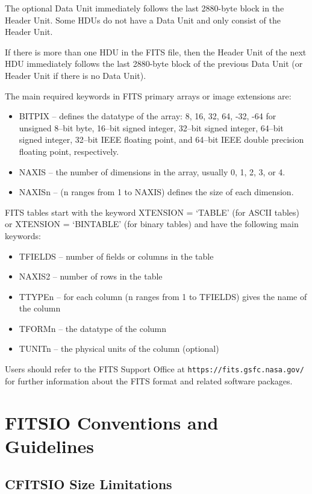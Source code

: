 \documentclass[11pt]{book}
\begin{document}
The optional Data Unit immediately follows the last 2880-byte block in
the Header Unit.  Some HDUs do not have a Data Unit and only consist of
the Header Unit.

If there is more than one HDU in the FITS file, then the Header Unit of
the next HDU immediately follows the last 2880-byte block of the
previous Data Unit (or Header Unit if there is no Data Unit).

The main required keywords in FITS primary arrays or image extensions are:
\begin{itemize}
\item
BITPIX -- defines the datatype of the array: 8, 16, 32, 64, -32, -64 for
unsigned 8--bit byte, 16--bit signed integer, 32--bit signed integer,
64--bit signed integer,
32--bit IEEE floating point, and 64--bit IEEE double precision floating
point, respectively.
\item
NAXIS --  the number of dimensions in the array, usually 0, 1, 2, 3, or 4.
\item
NAXISn -- (n ranges from 1 to NAXIS) defines the size of each dimension.
\end{itemize}

FITS tables start with the keyword XTENSION = `TABLE' (for ASCII
tables) or XTENSION = `BINTABLE' (for binary tables) and have the
following main keywords:
\begin{itemize}
\item
TFIELDS -- number of fields or columns in the table
\item
NAXIS2 -- number of rows in the table
\item
TTYPEn -- for each column (n ranges from 1 to TFIELDS) gives the
name of the column
\item
TFORMn -- the datatype of the column
\item
TUNITn -- the physical units of the column (optional)
\end{itemize}

Users should refer to the FITS Support Office at {\tt https://fits.gsfc.nasa.gov/}
for further information about the FITS format and related software
packages.



\chapter{FITSIO Conventions and Guidelines }


\section{CFITSIO Size Limitations}
\end{document}

